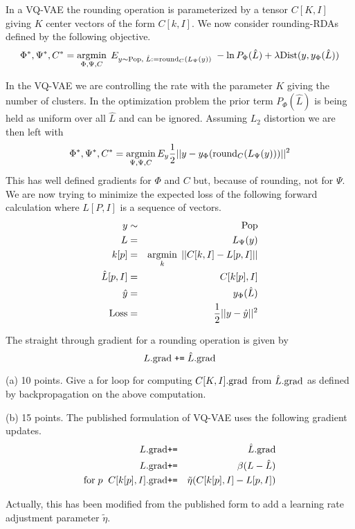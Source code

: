 \documentclass{article}
\newcommand{\solution}[1]{}
\begin{document}
In a VQ-VAE the rounding operation is parameterized by a tensor $C[K,I]$ giving $K$ center vectors of the form $C[k,I]$.
We now consider rounding-RDAs defined by the following objective.
$$\Phi^*,\Psi^*,C^* = \operatorname*{argmin}_{\Phi,\Psi,C}\;E_{y \sim \mathrm{Pop},\;\hat{L} :=\mathrm{round}_C(L_\Psi(y))}\;-\ln P_\Phi(\hat{L}) + \lambda\mathrm{Dist}(y,y_\Phi(\hat{L}))$$

In the VQ-VAE we are controlling the rate with the parameter $K$ giving the number of clusters.  In the optimization problem
the prior term $P_\Phi(\hat{L})$ is being held as uniform over all $\hat{L}$ and can be ignored.  Assuming $L_2$ distortion we are then left with
$$\Phi^*,\Psi^*,C^* = \operatorname*{argmin}_{\Psi,\Psi,C} E_y \frac{1}{2}||y - y_\Phi(\mathrm{round}_C(L_\Psi(y)))||^2$$
This has well defined gradients for $\Phi$ and $C$ but, because of rounding, not for $\Psi$.
We are now trying to minimize the expected loss of the following forward calculation where $L[P,I]$ is a sequence of vectors.
\begin{eqnarray*}
  y & \sim & \mathrm{Pop} \\
  L & = & L_\Psi(y) \\
  k[p] & = & \operatorname*{argmin}_k\;||C[k,I] - L[p,I]|| \\
  \hat{L}[p,I] & = & C[k[p],I] \\
  \hat{y} & = & y_\Phi(\hat{L}) \\
  \mathrm{Loss} & = & \frac{1}{2}||y - \hat{y}||^2
\end{eqnarray*}

The straight through gradient for a rounding operation is given by
$$L.\mathrm{grad}\; \mbox{\tt +=} \; \hat{L}.\mathrm{grad}$$

(a) 10 points. Give a for loop for computing $C[K,I].\mathrm{grad}$ from $\hat{L}.\mathrm{grad}$ as defined by backpropagation on the above computation.

\solution{

  $$\mathrm{for}\;p\;\;\;C[k[p],I].\grad \;\pluseq \;\hat{L}[p,I].\grad$$
  
}

(b) 15 points. The published formulation of VQ-VAE uses the following gradient updates.
\begin{eqnarray*}
L.\mathrm{grad} & \mbox{\tt +=} & \hat{L}.\mathrm{grad} \\
L.\mathrm{grad} & \mbox{\tt +=} & \beta(L - \hat{L}) \\
\mathrm{for}\;p\;\;C[k[p],I].\mathrm{grad} & \mbox{\tt +=} & \tilde{\eta}(C[k[p],I] - L[p,I])
\end{eqnarray*}

Actually, this has been modified from the published form to add a learning rate adjustment parameter $\tilde{\eta}$.
\end{document}
